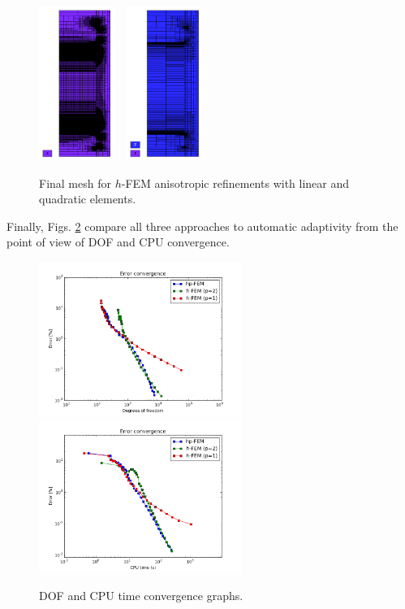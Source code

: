 \begin{figure}[!ht]
\centering
\includegraphics[height=5cm]{nist/nist-5/mesh_h1_aniso.png}\ \
\includegraphics[height=5cm]{nist/nist-5/mesh_h2_aniso.png}
\caption{Final mesh for $h$-FEM anisotropic refinements with linear and quadratic elements.}
\label{fig:nist-5-h-aniso}
\end{figure}

Finally, Figs. \ref{fig:nist-5-conv} compare all
three approaches to automatic adaptivity from the point
of view of DOF and CPU convergence.

\begin{figure}[!ht]
\centering
\includegraphics[height=5cm]{nist/nist-5/conv_dof_aniso.png}\ \
\includegraphics[height=5cm]{nist/nist-5/conv_cpu_aniso.png}
\caption{DOF and CPU time convergence graphs.}
\label{fig:nist-5-conv}
\end{figure}

